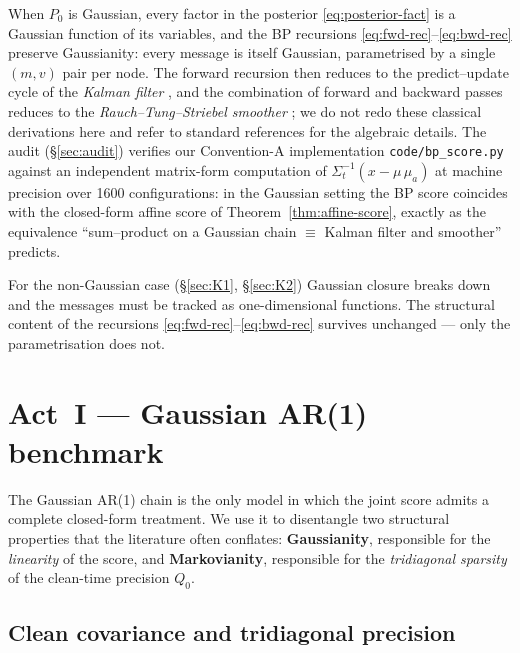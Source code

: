 \documentclass[11pt]{article}
\theoremstyle{definition}
\newcommand{\Sig}{\Sigma}
\begin{document}
When \(P_0\) is Gaussian, every factor in the posterior
\eqref{eq:posterior-fact} is a Gaussian function of its variables, and
the BP recursions \eqref{eq:fwd-rec}--\eqref{eq:bwd-rec} preserve
Gaussianity: every message is itself Gaussian, parametrised by a
single \((m, v)\) pair per node. The forward recursion then reduces to
the predict--update cycle of the \emph{Kalman filter}
\citep{Kalman1960}, and the combination of forward and backward
passes reduces to the \emph{Rauch--Tung--Striebel smoother}
\citep{RauchTungStriebel1965}; we do not redo these classical
derivations here and refer to standard references
\citep{KschischangFreyLoeliger2001, Bishop2006} for the algebraic
details. The audit (\S\ref{sec:audit}) verifies our Convention-A
implementation \texttt{code/bp\_score.py} against an independent
matrix-form computation of \(\Sig_t^{-1}(x - \mu\,\mu_a)\) at machine
precision over 1600 configurations: in the Gaussian setting the BP
score coincides with the closed-form affine score of
Theorem~\ref{thm:affine-score}, exactly as the equivalence
``sum--product on a Gaussian chain \(\equiv\) Kalman filter and
smoother'' predicts.

\medskip\noindent
For the non-Gaussian case (\S\ref{sec:K1}, \S\ref{sec:K2}) Gaussian
closure breaks down and the messages must be tracked as
one-dimensional functions. The structural content of the recursions
\eqref{eq:fwd-rec}--\eqref{eq:bwd-rec} survives unchanged --- only
the parametrisation does not.

\section{Act~I --- Gaussian AR(1) benchmark}\label{sec:gaussian}

The Gaussian AR(1) chain is the only model in which the joint score
admits a complete closed-form treatment. We use it to disentangle two
structural properties that the literature often conflates:
\textbf{Gaussianity}, responsible for the \emph{linearity} of the
score, and \textbf{Markovianity}, responsible for the \emph{tridiagonal
sparsity} of the clean-time precision \(Q_0\).

\subsection{Clean covariance and tridiagonal precision}
\end{document}
